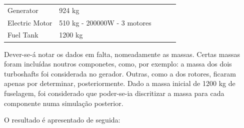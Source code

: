 \begin{table}[h]
\begin{adjustbox}{width=1\textwidth}
\begin{tabular}{|l|l|lll}
Generator                  & 924 kg                                            &                       &                               &                                                                   \\ \cline{1-2}
Electric Motor             & 510 kg - 200000W - 3 motores                      &                       &                               &                                                                   \\ \cline{1-2}
Fuel Tank                  & 1200 kg                                           &                       &                               &                                                                   \\ \cline{1-2}
\end{tabular}
\end{adjustbox}
\end{table}
\FloatBarrier
Dever-se-á notar os dados em falta, nomeadamente as massas. Certas massas foram incluídas noutros componetes, como, por exemplo: a massa dos dois turboshafts foi considerada no gerador. Outras, como a dos rotores, ficaram apenas por determinar, posteriormente. Dado a massa inicial de 1200 kg de fuselagem, foi considerado que poder-se-ia discritizar a massa para cada componente numa simulação posterior.\par
O resultado é apresentado de seguida:\par
\FloatBarrier
